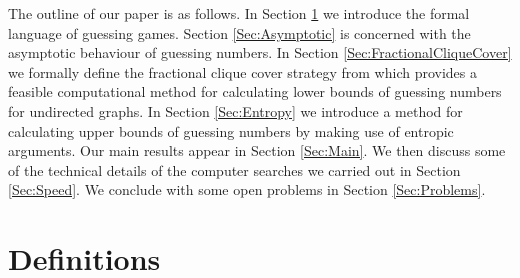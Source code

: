 \documentclass[a4paper, 14pt]{extarticle}
\theoremstyle{plain}
\begin{document}


The outline of our paper is as follows. In Section \ref{Sec:Definitions} we introduce the formal language of guessing games. Section \ref{Sec:Asymptotic} is concerned with the asymptotic behaviour of guessing numbers. In Section \ref{Sec:FractionalCliqueCover} we formally define the fractional clique cover strategy from \cite{Christofides&Markstrom11} which provides a feasible computational method for calculating lower bounds of guessing numbers for undirected graphs. In Section \ref{Sec:Entropy} we introduce a method for calculating upper bounds of guessing numbers by making use of entropic arguments. Our main results appear in Section \ref{Sec:Main}. We then discuss some of the technical details of the computer searches we carried out in Section \ref{Sec:Speed}. We conclude with some open problems in Section \ref{Sec:Problems}.

\section{Definitions}\label{Sec:Definitions}
\end{document}
